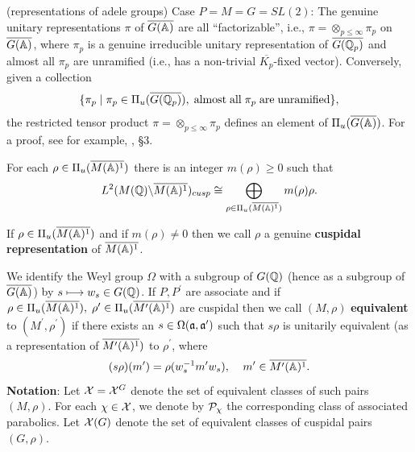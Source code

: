 \begin{example}
(representations of adele groups) {\sf Case} $P=M=G=SL(2)$:
The genuine unitary representations $\pi $ of
$\overline{G({{\Bbb{A}}})}$ are all
``factorizable'', i.e.,
$\pi =\otimes _{p\leq \infty}\pi _p$ on
$\overline{G({{\Bbb{A}}})}$, where
$\pi _p$ is a genuine irreducible unitary representation of
$\overline{G({\Bbb{Q}}_p)}$ and almost all $\pi _p$
are unramified (i.e., has a non-trivial
$\overline{K_p}$-fixed vector). Conversely, given a collection 
\[
\{\pi _p\;|\;\pi _p\in \Pi _u(\overline{G({\Bbb{Q}}_p)}),
\;{\rm almost\;all}\;\pi _p\;{\rm are\;unramified}\},
\]
the restricted tensor product
$\pi =\otimes _{p\leq \infty}\pi _p$
defines an element of $\Pi _u(\overline{G({\Bbb{A}})})$. For a proof,
see for example, \cite{Ge2}, \S 3.

\end{example}

\begin{proposition}
For each $\rho \in \Pi _u(\overline{M({\Bbb{A}})^1})$
there is an integer $m(\rho )\geq 0$ such that 
\[
L^2(M({{\Bbb{Q}}})\backslash \overline{M({\Bbb{A}})^1})_{cusp}\cong
\bigoplus_{\rho \in \Pi _u(\overline{M({\Bbb{A}})^1})}m(\rho )\rho .
\]
\end{proposition}

If
$\rho \in \Pi _u(\overline{M({\Bbb{A}})^1})$ and if $m(\rho )\neq 0$
then we call $\rho $ a genuine {\bf cuspidal
representation} of $\overline{M({\Bbb{A}})^1}$.

We identify the Weyl group $\Omega$ with a
subgroup of $G({\Bbb{Q}})$ (hence as a subgroup of
$\overline{G({\Bbb{A}})}$) by $s\longmapsto w_s\in G({\Bbb{Q}})$.
If $P,P^{\prime }$ are associate and if 
$\rho \in \Pi _u(\overline{M({\Bbb{A}})^1}),
\;\rho ^{\prime }\in \Pi _u(\overline{M^{\prime }({\Bbb{A}})^1})$
are cuspidal then we call $(M,\rho )$ {\bf equivalent} to
$(M^{\prime },\rho ^{\prime })$ if there exists an
$s\in \Omega ({\frak{a}}, {\frak{a}}^{\prime })$ such that
$s\rho $ is unitarily equivalent (as a
representation of $\overline{M^{\prime }({\Bbb{A}})^1})$
to $\rho ^{\prime }$, where 
\[
(s\rho )(m^{\prime })=\rho (w_s^{-1}m^{\prime }w_s),
\;\;\;\;m^{\prime }\in \overline{M^{\prime }({{\Bbb{A}}})^1}. 
\]
{\bf Notation}:
Let ${\cal{X}}={\cal{X}}^G$ denote the set of equivalent classes of such
pairs $(M,\rho )$.
For each $\chi \in {\cal X}$, we denote by
${\cal P}_\chi $ the corresponding class of associated parabolics.
Let ${\cal{X}}(G)$ denote the set of equivalent classes of
cuspidal pairs $(G,\rho )$.

